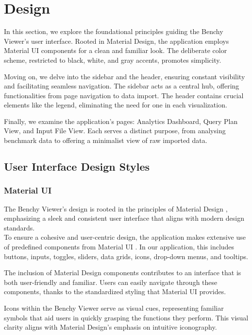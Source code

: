 
\section{Design}
In this section, we explore the foundational principles guiding the Benchy Viewer's user interface. Rooted in Material Design, the application employs Material UI components for a clean and familiar look. The deliberate color scheme, restricted to black, white, and gray accents, promotes simplicity.

Moving on, we delve into the sidebar and the header, ensuring constant visibility and facilitating seamless navigation. The sidebar acts as a central hub, offering functionalities from page navigation to data import. The header contains crucial elements like the legend, eliminating the need for one in each visualization.

Finally, we examine the application's pages: Analytics Dashboard, Query Plan View, and Input File View. Each serves a distinct purpose, from analysing benchmark data to offering a minimalist view of raw imported data. 


\subsection{User Interface Design Styles}
\subsubsection{Material UI}

The Benchy Viewer's design is rooted in the principles of Material Design \parencite*{material-design}, emphasizing a sleek and consistent user interface that aligns with modern design standards.\\
To ensure a cohesive and user-centric design, the application makes extensive use of predefined components from Material UI \parencite*{mui}. In our application, this includes buttons, inputs, toggles, sliders, data grids, icons, drop-down menus, and tooltips.

The inclusion of Material Design components contributes to an interface that is both user-friendly and familiar. Users can easily navigate through these components, thanks to the standardized styling that Material UI provides.

Icons within the Benchy Viewer serve as visual cues, representing familiar symbols that aid users in quickly grasping the functions they perform. This visual clarity aligns with Material Design's emphasis on intuitive iconography.

